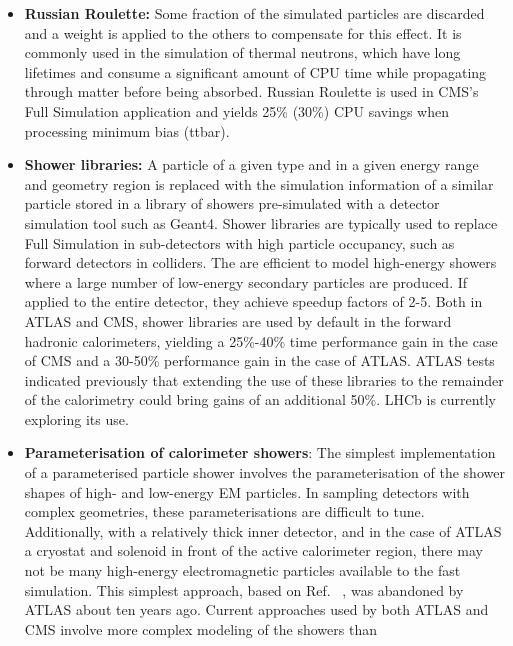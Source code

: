 \documentclass[12pt,a4paper]{article}
\begin{document}
{\begin{itemize}
\item
  \textbf{Russian Roulette:} Some fraction of the simulated particles
  are discarded and a weight is applied to the others to compensate for
  this effect. It is commonly used in the simulation of thermal
  neutrons, which have long lifetimes and consume a significant amount
  of CPU time while propagating through matter before being absorbed.
  Russian Roulette is used in CMS's Full Simulation application and
  yields 25\% (30\%) CPU savings when processing minimum bias (ttbar).
\end{itemize}

\begin{itemize}
\item
  \textbf{Shower libraries:} A particle of a given type and in a given
  energy range and geometry region is replaced with the simulation
  information of a similar particle stored in a library of showers
  pre-simulated with a detector simulation tool such as Geant4. Shower
  libraries are typically used to replace Full Simulation in
  sub-detectors with high particle occupancy, such as forward detectors
  in colliders. The are efficient to model high-energy showers where a
  large number of low-energy secondary particles are produced. If
  applied to the entire detector, they achieve speedup factors of 2-5.
  Both in ATLAS and CMS, shower libraries are used by default in the
  forward hadronic calorimeters, yielding a 25\%-40\% time performance
  gain in the case of CMS and a 30-50\% performance gain in the case of
  ATLAS. ATLAS tests indicated previously that extending the use of
  these libraries to the remainder of the calorimetry could bring gains
  of an additional 50\%. LHCb is currently exploring its use.
\item
  \textbf{Parameterisation of calorimeter showers}: The simplest
  implementation of a parameterised particle shower involves the
  parameterisation of the shower shapes of high- and low-energy EM
  particles. In sampling detectors with complex geometries, these
  parameterisations are difficult to tune. Additionally, with a
  relatively thick inner detector, and in the case of ATLAS a cryostat
  and solenoid in front of the active calorimeter region, there may not
  be many high-energy electromagnetic particles available to the fast
  simulation. This simplest approach, based on Ref. ~\cite{Sjostrand:2014zea}, was
  abandoned by ATLAS about ten years ago. Current approaches used by
  both ATLAS and CMS involve more complex modeling of the showers than

\end{itemize}}
\end{document}
